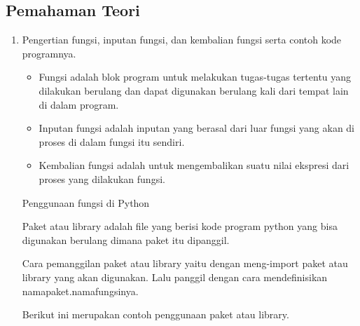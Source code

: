 \subsection{Pemahaman Teori}
\begin{enumerate}
	
	\item Pengertian fungsi, inputan fungsi, dan kembalian fungsi serta contoh kode programnya.
	
	\begin{itemize}
		
		\item Fungsi adalah blok program untuk melakukan tugas-tugas tertentu yang dilakukan berulang dan dapat digunakan berulang kali dari tempat lain di dalam program.
		
		
		\item Inputan fungsi adalah inputan yang berasal dari luar fungsi yang akan di proses di dalam fungsi itu sendiri.
		
		
		\item Kembalian fungsi adalah untuk mengembalikan suatu nilai ekspresi dari proses yang dilakukan fungsi.
		
		
	\end{itemize}
	
	Penggunaan fungsi di Python
	
	
	
	Paket atau library adalah file yang berisi kode program python yang bisa digunakan berulang dimana paket itu dipanggil.
	
	Cara pemanggilan paket atau library yaitu dengan meng-import paket atau library yang akan digunakan. Lalu panggil dengan cara mendefinisikan namapaket.namafungsinya.
	
	Berikut ini merupakan contoh penggunaan paket atau library.
	
	

\end{enumerate}
